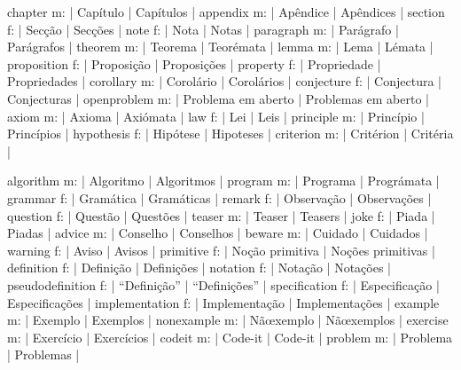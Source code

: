 \DefNoun  chapter           m: | Capítulo              | Capítulos               |
\DefNoun  appendix          m: | Apêndice              | Apêndices               |
\DefNoun  section           f: | Secção                | Secções                 |
\DefNoun  note              f: | Nota                  | Notas                   |
\DefNoun  paragraph         m: | Parágrafo             | Parágrafos              |
\DefNoun  theorem           m: | Teorema               | Teorémata               |
\DefNoun  lemma             m: | Lema                  | Lémata                  |
\DefNoun  proposition       f: | Proposição            | Proposições             |
\DefNoun  property          f: | Propriedade           | Propriedades            |
\DefNoun  corollary         m: | Corolário             | Corolários              |
\DefNoun  conjecture        f: | Conjectura            | Conjecturas             |
\DefNoun  openproblem       m: | {Problema em aberto}  | {Problemas em aberto}   |
\DefNoun  axiom             m: | Axioma                | Axiómata                |
\DefNoun  law               f: | Lei                   | Leis                    |
\DefNoun  principle         m: | Princípio             | Princípios              |
\DefNoun  hypothesis        f: | Hipótese              | Hipoteses               |
\DefNoun  criterion         m: | Critérion             | Critéria                |

\DefNoun  algorithm         m: | Algoritmo             | Algoritmos              |
\DefNoun  program           m: | Programa              | Prográmata              |
\DefNoun  grammar           f: | Gramática             | Gramáticas              |
\DefNoun  remark            f: | Observação            | Observações             |
\DefNoun  question          f: | Questão               | Questões                |
\DefNoun  teaser            m: | Teaser                | Teasers                 |
\DefNoun  joke              f: | Piada                 | Piadas                  |
\DefNoun  advice            m: | Conselho              | Conselhos               |
\DefNoun  beware            m: | Cuidado               | Cuidados                |
\DefNoun  warning           f: | Aviso                 | Avisos                  |
\DefNoun  primitive         f: | {Noção primitiva}     | {Noções primitivas}     |
\DefNoun  definition        f: | Definição             | Definições              |
\DefNoun  notation          f: | Notação               | Notações                |
\DefNoun  pseudodefinition  f: | ``Definição''         | ``Definições''          |
\DefNoun  specification     f: | Especificação         | Especificações          |
\DefNoun  implementation    f: | Implementação         | Implementações          |
\DefNoun  example           m: | Exemplo               | Exemplos                |
\DefNoun  nonexample        m: | Nãœxemplo             | Nãœxemplos              |
\DefNoun  exercise          m: | Exercício             | Exercícios              |
\DefNoun  codeit            m: | Code-it               | Code-it                 |
\DefNoun  problem           m: | Problema              | Problemas               |

